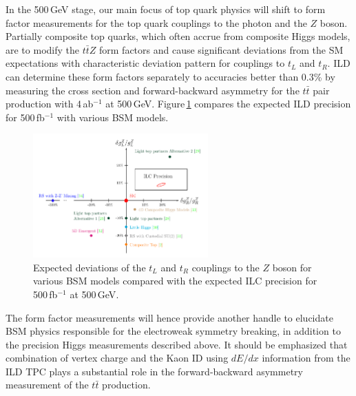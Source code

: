 In the 500\,GeV stage, our main focus of top quark physics will shift to form factor measurements for the top quark couplings to the photon and the $Z$ boson. Partially composite top quarks, which often accrue from composite Higgs models, are to modify the $t\bar{t}Z$ form factors and cause significant deviations from the SM expectations with characteristic deviation pattern for couplings to $t_L$ and $t_R$. ILD can determine these form factors separately to accuracies better than 0.3\%
by measuring the cross section and forward-backward asymmetry for the $t\bar{t}$ pair production with 4\,ab$^{-1}$ at 500\,GeV\cite{Amjad:2015mma}. 
Figure\,\ref{fig:ttZ_gLgR} compares the expected ILD precision for 500\,fb$^{-1}$ with various BSM models.
\begin{figure}[htbp]
\begin{center}
 \includegraphics[width=0.6\textwidth]{Science/fig/ttZ_gLgR}
\end{center}
\caption{Expected deviations of the $t_L$ and $t_R$ couplings to the $Z$ boson for various BSM models compared with the expected ILC precision for 500\,fb$^{-1}$ at 500\,GeV\cite{Amjad:2015mma}.
}
\label{fig:ttZ_gLgR}
\end{figure}
The form factor measurements will hence provide another handle to elucidate BSM physics responsible for the electroweak symmetry breaking, in addition to the precision Higgs measurements described above. It should be emphasized that combination of vertex charge and the Kaon ID using $dE/dx$ information from the ILD TPC plays a substantial role in the forward-backward asymmetry measurement of the $t\bar{t}$ production\cite{Ref:bilokin2017}.
%


%


